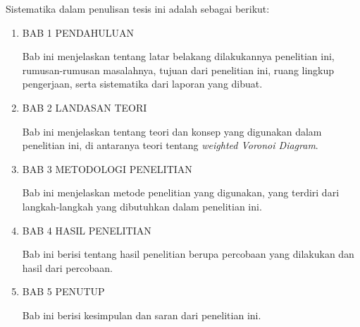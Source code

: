 Sistematika dalam penulisan tesis ini adalah sebagai berikut:
\begin{enumerate}

\item BAB 1 PENDAHULUAN

Bab ini menjelaskan tentang latar belakang dilakukannya penelitian ini, rumusan-rumusan masalahnya, tujuan dari penelitian ini, ruang lingkup pengerjaan, serta sistematika dari laporan yang dibuat.

\item BAB 2 LANDASAN TEORI

Bab ini menjelaskan tentang teori dan konsep yang digunakan dalam penelitian ini, di antaranya teori tentang \textit{weighted Voronoi Diagram}.

\item BAB 3 METODOLOGI PENELITIAN 

Bab ini menjelaskan metode penelitian yang digunakan, yang terdiri dari langkah-langkah yang dibutuhkan dalam penelitian ini.

\item BAB 4 HASIL PENELITIAN

Bab ini berisi tentang hasil penelitian berupa percobaan yang dilakukan dan hasil dari percobaan.

\item BAB 5 PENUTUP

Bab ini berisi kesimpulan dan saran dari penelitian ini.
\end{enumerate}